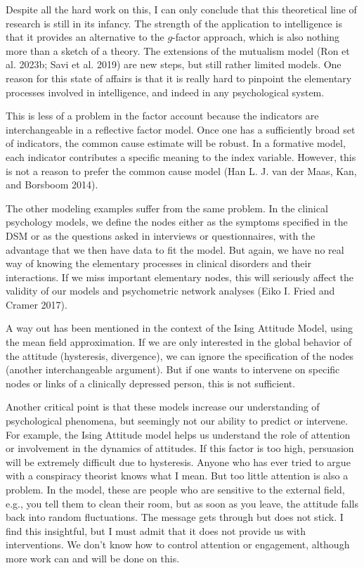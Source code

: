 \documentclass[
  a4paper,
  DIV=11,
  numbers=noendperiod]{scrreprt}
\begin{document}
Despite all the hard work on this, I can only conclude that this
theoretical line of research is still in its infancy. The strength of
the application to intelligence is that it provides an alternative to
the \(g\)-factor approach, which is also nothing more than a sketch of a
theory. The extensions of the mutualism model (Ron et al. 2023b; Savi et
al. 2019) are new steps, but still rather limited models. One reason for
this state of affairs is that it is really hard to pinpoint the
elementary processes involved in intelligence, and indeed in any
psychological system.

This is less of a problem in the factor account because the indicators
are interchangeable in a reflective factor model. Once one has a
sufficiently broad set of indicators, the common cause estimate will be
robust. In a formative model, each indicator contributes a specific
meaning to the index variable. However, this is not a reason to prefer
the common cause model (Han L. J. van der Maas, Kan, and Borsboom 2014).

The other modeling examples suffer from the same problem. In the
clinical psychology models, we define the nodes either as the symptoms
specified in the DSM or as the questions asked in interviews or
questionnaires, with the advantage that we then have data to fit the
model. But again, we have no real way of knowing the elementary
processes in clinical disorders and their interactions. If we miss
important elementary nodes, this will seriously affect the validity of
our models and psychometric network analyses (Eiko I. Fried and Cramer
2017).

A way out has been mentioned in the context of the Ising Attitude Model,
using the mean field approximation. If we are only interested in the
global behavior of the attitude (hysteresis, divergence), we can ignore
the specification of the nodes (another interchangeable argument). But
if one wants to intervene on specific nodes or links of a clinically
depressed person, this is not sufficient.

Another critical point is that these models increase our understanding
of psychological phenomena, but seemingly not our ability to predict or
intervene. For example, the Ising Attitude model helps us understand the
role of attention or involvement in the dynamics of attitudes. If this
factor is too high, persuasion will be extremely difficult due to
hysteresis. Anyone who has ever tried to argue with a conspiracy
theorist knows what I mean. But too little attention is also a problem.
In the model, these are people who are sensitive to the external field,
e.g., you tell them to clean their room, but as soon as you leave, the
attitude falls back into random fluctuations. The message gets through
but does not stick. I find this insightful, but I must admit that it
does not provide us with interventions. We don't know how to control
attention or engagement, although more work can and will be done on
this.
\end{document}
